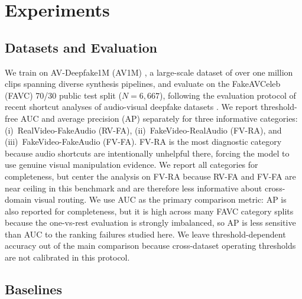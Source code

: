\documentclass{article}
\begin{document}
\section{Experiments}

\subsection{Datasets and Evaluation}

We train on AV-Deepfake1M (AV1M) \citep{cai2024avdeepfake1m}, a large-scale dataset of over one million clips spanning diverse synthesis pipelines, and evaluate on the FakeAVCeleb (FAVC) \citep{khalid2021fakeavceleb} 70/30 public test split ($N=6{,}667$), following the evaluation protocol of recent shortcut analyses of audio-visual deepfake datasets \citep{smeu2025avhalign}. We report threshold-free AUC and average precision (AP) separately for three informative categories: (i)~RealVideo-FakeAudio (RV-FA), (ii)~FakeVideo-RealAudio (FV-RA), and (iii)~FakeVideo-FakeAudio (FV-FA). FV-RA is the most diagnostic category because audio shortcuts are intentionally unhelpful there, forcing the model to use genuine visual manipulation evidence. We report all categories for completeness, but center the analysis on FV-RA because RV-FA and FV-FA are near ceiling in this benchmark and are therefore less informative about cross-domain visual routing. We use AUC as the primary comparison metric: AP is also reported for completeness, but it is high across many FAVC category splits because the one-vs-rest evaluation is strongly imbalanced, so AP is less sensitive than AUC to the ranking failures studied here. We leave threshold-dependent accuracy out of the main comparison because cross-dataset operating thresholds are not calibrated in this protocol.

\subsection{Baselines}
\end{document}
